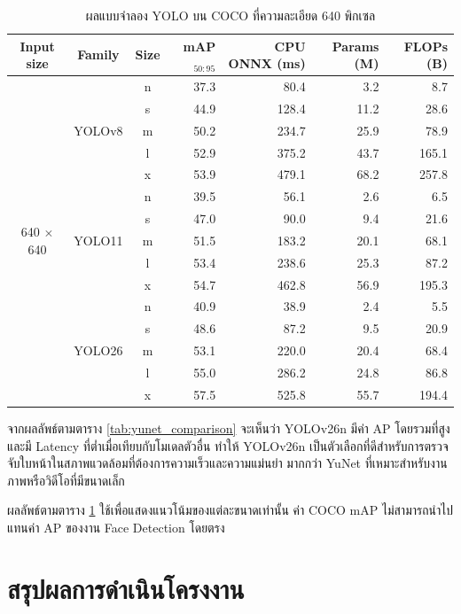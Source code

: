 \small
\setlength{\LTcapwidth}{\textwidth}
\begin{longtable}{c c c r r r r}
\caption{ผลแบบจำลอง YOLO บน COCO ที่ความละเอียด 640 พิกเซล}
\label{tab:yolo-family-reference}\\
\toprule
\textbf{Input size} & \textbf{Family} & \textbf{Size} & \textbf{mAP$_{50:95}$} & \textbf{CPU ONNX (ms)} & \textbf{Params (M)} & \textbf{FLOPs (B)} \\
\midrule
\multirow{15}{*}{640 $\times$ 640} & \multirow{5}{*}{YOLOv8} & n & 37.3 & 80.4 & 3.2 & 8.7 \\
 & & s & 44.9 & 128.4 & 11.2 & 28.6 \\
 & & m & 50.2 & 234.7 & 25.9 & 78.9 \\
 & & l & 52.9 & 375.2 & 43.7 & 165.1 \\
 & & x & 53.9 & 479.1 & 68.2 & 257.8 \\
\midrule
& \multirow{5}{*}{YOLO11} & n & 39.5 & 56.1 & 2.6 & 6.5 \\
 & & s & 47.0 & 90.0 & 9.4 & 21.6 \\
 & & m & 51.5 & 183.2 & 20.1 & 68.1 \\
 & & l & 53.4 & 238.6 & 25.3 & 87.2 \\
 & & x & 54.7 & 462.8 & 56.9 & 195.3 \\
\midrule
& \multirow{5}{*}{YOLO26} & n & 40.9 & 38.9 & 2.4 & 5.5 \\
 & & s & 48.6 & 87.2 & 9.5 & 20.9 \\
 & & m & 53.1 & 220.0 & 20.4 & 68.4 \\
 & & l & 55.0 & 286.2 & 24.8 & 86.8 \\
 & & x & 57.5 & 525.8 & 55.7 & 194.4 \\
\bottomrule
\end{longtable}

จากผลลัพธ์ตามตาราง \ref{tab:yunet_comparison} จะเห็นว่า YOLOv26n มีค่า AP โดยรวมที่สูงและมี Latency ที่ต่ำเมื่อเทียบกับโมเดลตัวอื่น ทำให้ YOLOv26n เป็นตัวเลือกที่ดีสำหรับการตรวจจับใบหน้าในสภาพแวดล้อมที่ต้องการความเร็วและความแม่นยำ มากกว่า YuNet ที่เหมาะสำหรับงานภาพหรือวิดีโอที่มีขนาดเล็ก

ผลลัพธ์ตามตาราง \ref{tab:yolo-family-reference} ใช้เพื่อแสดงแนวโน้มของแต่ละขนาดเท่านั้น ค่า COCO mAP ไม่สามารถนำไปแทนค่า AP ของงาน Face Detection โดยตรง



\section{สรุปผลการดำเนินโครงงาน}


